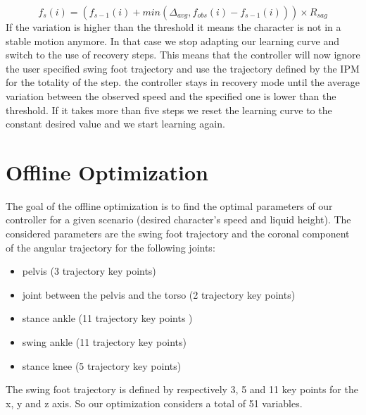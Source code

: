 \documentclass[conference]{acmsiggraph}
\begin{document}
\begin{equation}
f_s(i)= (f_{s-1}(i) + min(\Delta_{avg},f_{obs}(i)- f_{s-1}(i))) \times R_{sag}
\end{equation}
If the variation is higher than the threshold it means the character is not in a stable motion anymore. In that case we stop adapting our learning curve and switch to the use of recovery steps. This means that the controller will now ignore the user specified swing foot trajectory and use the trajectory defined by the IPM for the totality of the step. the controller stays in recovery mode until the average variation between the observed speed and the specified one is lower than the threshold. If it takes more than five steps we reset the learning curve to the constant desired value and we start learning again. 


\section{Offline Optimization}
\label{sec:optimisation}

The goal of the offline optimization is to find the optimal parameters of our controller for a given scenario (desired character's speed and liquid height). The considered parameters are the swing foot trajectory and the coronal component of the angular trajectory for the following joints:
\begin{itemize}[noitemsep,nolistsep]
\item pelvis (3 trajectory key points)
\item joint between the pelvis and the torso (2 trajectory key points)
\item stance ankle (11 trajectory key points )
\item swing ankle (11 trajectory key points)
\item stance knee (5 trajectory key points)
\end{itemize}
The swing foot trajectory is defined by respectively 3, 5 and 11 key points for the x, y and z axis. So our optimization considers a total of 51 variables.
\end{document}
